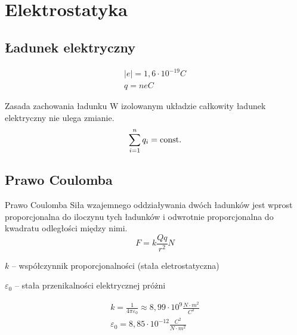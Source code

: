 \chapter{Elektrostatyka}
  \section{Ładunek elektryczny}
    \begin{gather*}
      |e| = 1,6\cdot 10^{-19} \unit{C}\\
      q = ne \unit{C}
    \end{gather*}
    \begin{law}{Zasada zachowania ładunku}
      W izolowanym układzie całkowity ładunek elektryczny nie ulega zmianie.
      \begin{equation}
        \sum_{i=1}^n q_i = \operatorname{const.}
      \end{equation}
    \end{law}

  \section{Prawo Coulomba}
    \begin{law}{Prawo Coulomba}
      Siła wzajemnego oddziaływania dwóch ładunków jest wprost proporcjonalna do iloczynu tych ładunków i odwrotnie proporcjonalna do kwadratu odległości między nimi.
      \begin{equation}\label{coulomb}
        \boxed{F = k\frac{Qq}{r^2} \unit{N}}
      \end{equation}
      \begin{symbols}
        \item $k$ -- współczynnik proporcjonalności (stała eletrostatyczna)
        \item $\varepsilon_0$ -- stała przenikalności elektrycznej próżni
      \end{symbols}
      \begin{gather*}
        k = \frac{1}{4\pi\varepsilon_0} \approx 8,99\cdot 10^9 \unit{\frac{N\cdot m^2}{C^2}}\\[0.5em]
        \varepsilon_0 = 8,85\cdot 10^{-12} \unit{\frac{C^2}{N\cdot m^2}}
      \end{gather*}
    \end{law}


